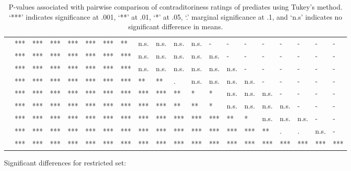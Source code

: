 \documentclass[11pt,fleqn]{article}
\newcommand{\6}{\mbox{$[\hspace*{-.6mm}[$}}
\newcommand{\9}{\mbox{$]\hspace*{-.6mm}]$}}
\begin{document}
\begin{landscape}
\begin{table}[h!]
\begin{tabular}{l l l l l l l l l l l l l l l l l l l l }
\color{green}{\em admit}\color{black}			& *** & *** & *** & *** & *** & *** & ** & n.s. & n.s. & n.s. & n.s. & - & - & - & - & - & - & - & - \\
\color{blue}{\em establish}\color{black}		& *** & *** & *** & *** & *** & *** & *** & n.s. & n.s. & n.s. & n.s. &  n.s. & - & - & - & - & - & - & - \\
\color{green}{\em demonstrate}\color{black}	& *** & *** & *** & *** & *** & *** & *** & n.s. & n.s. & n.s. & n.s. & n.s. & n.s. & - & - & - & - & - & - \\
\color{blue}{\em discover}\color{black}		& *** & *** & *** & *** & *** & *** & *** & ** & ** & . & n.s. & n.s. & n.s. & n.s. & - & - & - & - & - \\
\color{green}{\em confirm}\color{black}		& *** & *** & *** & *** & *** & *** & *** & *** & *** & ** & * & * & n.s. & n.s. & n.s. & - & - & - & - \\
\color{blue}{\em see}\color{black}			& *** & *** & *** & *** & *** & *** & *** & *** & *** & ** & ** & * & n.s. & n.s. & n.s. & n.s. & - & - & - \\
\color{blue}{\em know}\color{black}			& *** & *** & *** & *** & *** & *** & *** & *** & *** & *** & *** & *** & ** & * & n.s. & n.s. & n.s. & - & - \\
\color{green}{\em prove}\color{black}			& *** & *** & *** & *** & *** & *** & *** & *** & *** & *** & *** & *** & *** & *** & ** & . & . & n.s. & -  \\
\color{blue}{\em be right}\color{black}		& *** & *** & *** & *** & *** & *** & *** & *** & ***  & ***  & *** & *** & *** & *** & *** & *** & *** & *** & ***  \\

\bottomrule
\end{tabular}
\caption{P-values associated with pairwise comparison of contraditoriness ratings of prediates using Tukey's method. `***' indicates significance at .001, `**' at .01, `*' at .05, `.' marginal significance at .1, and `n.s' indicates no significant difference in means.}\label{t-pairwise}
\end{table}
\end{landscape}


\newpage

Significant differences for restricted set:
\end{document}
